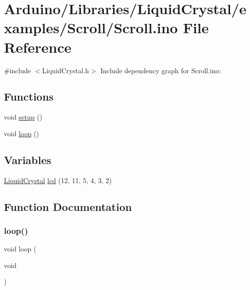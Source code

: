 \hypertarget{_scroll_8ino}{}\section{Arduino/\+Libraries/\+Liquid\+Crystal/examples/\+Scroll/\+Scroll.ino File Reference}
\label{_scroll_8ino}
{\ttfamily \#include $<$Liquid\+Crystal.\+h$>$}\newline
Include dependency graph for Scroll.\+ino\+:
\subsection*{Functions}
\begin{DoxyCompactItemize}
\item 
void \hyperlink{_scroll_8ino_a4fc01d736fe50cf5b977f755b675f11d}{setup} ()
\item 
void \hyperlink{_scroll_8ino_afe461d27b9c48d5921c00d521181f12f}{loop} ()
\end{DoxyCompactItemize}
\subsection*{Variables}
\begin{DoxyCompactItemize}
\item 
\hyperlink{class_liquid_crystal}{Liquid\+Crystal} \hyperlink{_scroll_8ino_a7226623e632d4109904c86009c9f3b60}{lcd} (12, 11, 5, 4, 3, 2)
\end{DoxyCompactItemize}


\subsection{Function Documentation}
\mbox{\label{_scroll_8ino_afe461d27b9c48d5921c00d521181f12f}} 
\subsubsection{\texorpdfstring{loop()}{loop()}}
{\footnotesize\ttfamily void loop (\begin{DoxyParamCaption}\item[{void}]{ }\end{DoxyParamCaption})}

\mbox{\label{_scroll_8ino_a4fc01d736fe50cf5b977f755b675f11d}} 
